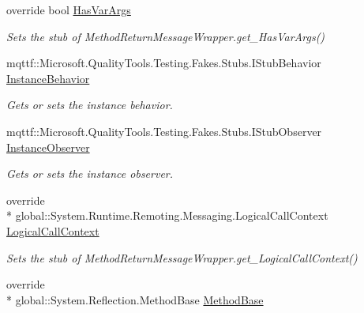 \begin{DoxyCompactItemize}
override bool \hyperlink{class_system_1_1_runtime_1_1_remoting_1_1_messaging_1_1_fakes_1_1_stub_method_return_message_wrapper_a5e23a08f36cc86b916776e07137562e2}{Has\-Var\-Args}
\begin{DoxyCompactList}\small\item\em Sets the stub of Method\-Return\-Message\-Wrapper.\-get\-\_\-\-Has\-Var\-Args()\end{DoxyCompactList}\item 
mqttf\-::\-Microsoft.\-Quality\-Tools.\-Testing.\-Fakes.\-Stubs.\-I\-Stub\-Behavior \hyperlink{class_system_1_1_runtime_1_1_remoting_1_1_messaging_1_1_fakes_1_1_stub_method_return_message_wrapper_ab7781dae6ce777d4b80e840fc2b18710}{Instance\-Behavior}
\begin{DoxyCompactList}\small\item\em Gets or sets the instance behavior.\end{DoxyCompactList}\item 
mqttf\-::\-Microsoft.\-Quality\-Tools.\-Testing.\-Fakes.\-Stubs.\-I\-Stub\-Observer \hyperlink{class_system_1_1_runtime_1_1_remoting_1_1_messaging_1_1_fakes_1_1_stub_method_return_message_wrapper_a11d308b37537826d443f989609901d8e}{Instance\-Observer}
\begin{DoxyCompactList}\small\item\em Gets or sets the instance observer.\end{DoxyCompactList}\item 
override \\*
global\-::\-System.\-Runtime.\-Remoting.\-Messaging.\-Logical\-Call\-Context \hyperlink{class_system_1_1_runtime_1_1_remoting_1_1_messaging_1_1_fakes_1_1_stub_method_return_message_wrapper_aa2fde28532a6354ff57c3032d29664e8}{Logical\-Call\-Context}
\begin{DoxyCompactList}\small\item\em Sets the stub of Method\-Return\-Message\-Wrapper.\-get\-\_\-\-Logical\-Call\-Context()\end{DoxyCompactList}\item 
override \\*
global\-::\-System.\-Reflection.\-Method\-Base \hyperlink{class_system_1_1_runtime_1_1_remoting_1_1_messaging_1_1_fakes_1_1_stub_method_return_message_wrapper_acf72b41eda9941d2985e69bb2b204e40}{Method\-Base}

\end{DoxyCompactItemize}
